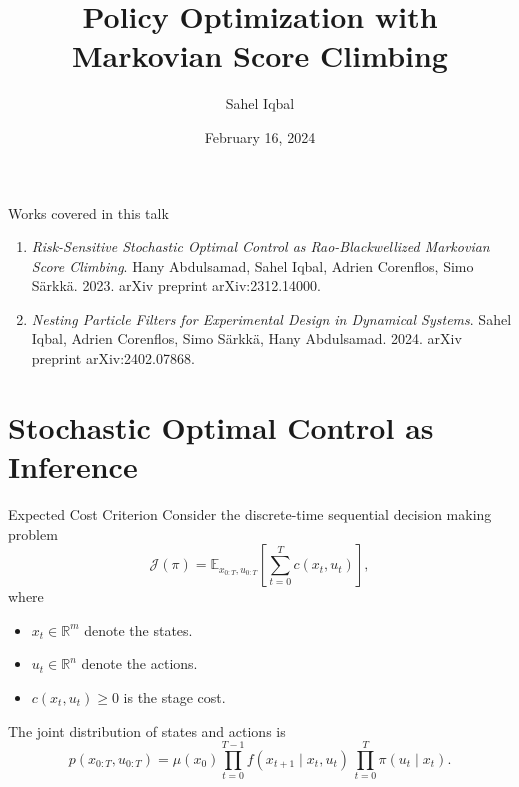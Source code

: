 \documentclass[10pt, aspectratio=1610]{beamer}
\title{Policy Optimization with Markovian Score Climbing}
\date{February 16, 2024}
\author{Sahel Iqbal}
\institute{Aalto University, Finland}
\begin{document}
  \maketitle

  
  \begin{frame}{Works covered in this talk}
    \begin{enumerate}
      \item \emph{Risk-Sensitive Stochastic Optimal Control as Rao-Blackwellized Markovian Score Climbing}. Hany Abdulsamad, Sahel Iqbal, Adrien Corenflos, Simo S\"arkk\"a. 2023. arXiv preprint arXiv:2312.14000.
      \item \emph{Nesting Particle Filters for Experimental Design in Dynamical Systems}. Sahel Iqbal, Adrien Corenflos, Simo S\"arkk\"a, Hany Abdulsamad. 2024. arXiv preprint arXiv:2402.07868.
    \end{enumerate}
  \end{frame}

  \section{Stochastic Optimal Control as Inference}
    \begin{frame}{Expected Cost Criterion}
      Consider the discrete-time sequential decision making problem
      \begin{equation}\label{eq:soc_objective}
        \mathcal{J}(\pi) = \mathbb{E}_{x_{0:T}, u_{0:T}} \left[\sum_{t=0}^{T} c(x_t, u_t)\right],
      \end{equation}
      where
      \begin{itemize}
        \item $x_t \in \mathbb{R}^m$ denote the states.
        \item $u_t \in \mathbb{R}^n$ denote the actions.
        \item $c(x_t, u_t) \geq 0$ is the stage cost.
      \end{itemize}
  
      \vskip 1cm
      The joint distribution of states and actions is
      \begin{equation}
          p(x_{0:T}, u_{0:T}) = \mu(x_{0}) \prod_{t=0}^{T-1} f(x_{t+1} \mid x_t, u_t) \, \prod_{t=0}^T \pi(u_t \mid x_t).
      \end{equation}
    \end{frame}
\end{document}
